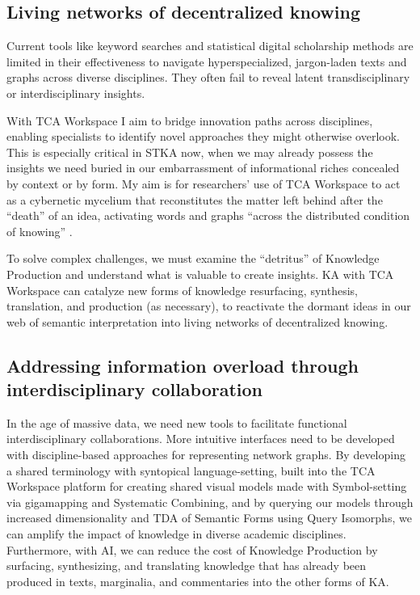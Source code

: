 \subsection{Living networks of decentralized knowing}

Current tools like keyword searches and statistical digital scholarship methods are limited in their effectiveness to navigate hyperspecialized, jargon-laden texts and graphs across diverse disciplines. They often fail to reveal latent transdisciplinary or interdisciplinary insights. 

With TCA Workspace I aim to bridge innovation paths across disciplines, enabling specialists to identify novel approaches they might otherwise overlook. This is especially critical in STKA now, when we may already possess the insights we need buried in our embarrassment of informational riches concealed by context or by form. My aim is for researchers’ use of TCA Workspace to act as a cybernetic mycelium that reconstitutes the matter left behind after the “death” of an idea, activating words and graphs “across the distributed condition of knowing” \citep[p. 192]{drucker_graphesis_2014}. 

To solve complex challenges, we must examine the “detritus” of Knowledge Production and understand what is valuable to create insights. KA with TCA Workspace can catalyze new forms of knowledge resurfacing, synthesis, translation, and production (as necessary), to reactivate the dormant ideas in our web of semantic interpretation into living networks of decentralized knowing. 


\subsection{Addressing information overload through interdisciplinary collaboration}

In the age of massive data, we need new tools to facilitate functional interdisciplinary collaborations. More intuitive interfaces need to be developed with discipline-based approaches for representing network graphs. By developing a shared terminology with syntopical language-setting, built into the TCA Workspace platform for creating shared visual models made with Symbol-setting via gigamapping and Systematic Combining, and by querying our models through increased dimensionality and TDA of Semantic Forms using Query Isomorphs, we can amplify the impact of knowledge in diverse academic disciplines. Furthermore, with AI, we can reduce the cost of Knowledge Production by surfacing, synthesizing, and translating knowledge that has already been produced in texts, marginalia, and commentaries into the other forms of KA.

